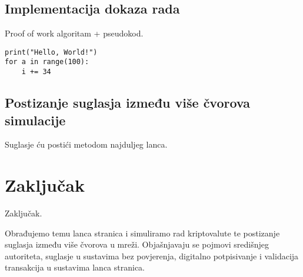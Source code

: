 \documentclass[utf8, zavrsni]{fer}
\begin{document}
\section{Implementacija dokaza rada}
Proof of work algoritam + pseudokod.

\begin{verbatim}
print("Hello, World!")
for a in range(100):
	i += 34
\end{verbatim}

\section{Postizanje suglasja između više čvorova simulacije}
Suglasje ću postići metodom najduljeg lanca.


\chapter{Zaključak}
Zaključak.





\begin{sazetak}
	Obrađujemo temu lanca stranica i simuliramo rad kriptovalute te postizanje suglasja između više čvorova u mreži. Objašnjavaju se pojmovi središnjeg autoriteta, suglasje u sustavima bez povjerenja, digitalno potpisivanje i validacija transakcija u sustavima lanca stranica.

\end{sazetak}

\begin{abstract}
	
\end{abstract}
\end{document}
